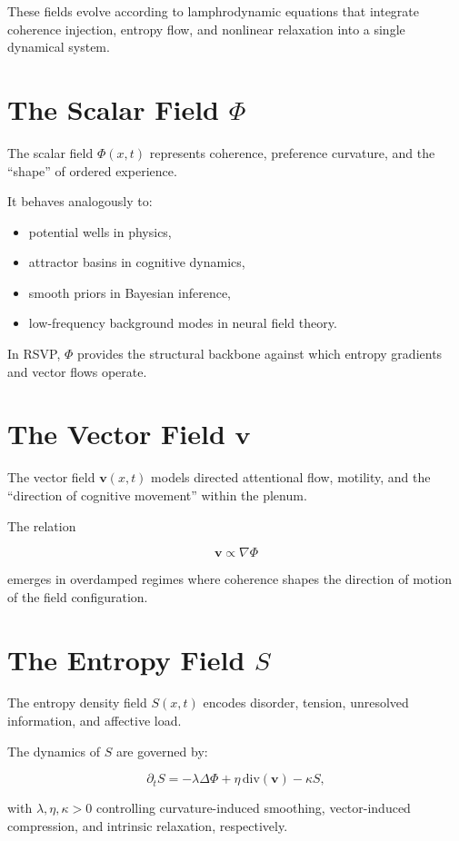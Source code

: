 \documentclass[12pt]{article}
\begin{document}
These fields evolve according to lamphrodynamic equations that integrate
coherence injection, entropy flow, and nonlinear relaxation into a single dynamical system.

\section{The Scalar Field $\Phi$}

The scalar field $\Phi(x,t)$ represents coherence, preference curvature,
and the ``shape'' of ordered experience.

It behaves analogously to:

\begin{itemize}
\item potential wells in physics,
\item attractor basins in cognitive dynamics,
\item smooth priors in Bayesian inference,
\item low-frequency background modes in neural field theory.
\end{itemize}

In RSVP, $\Phi$ provides the structural backbone against which entropy gradients
and vector flows operate.

\section{The Vector Field $\mathbf{v}$}

The vector field $\mathbf{v}(x,t)$ models directed attentional flow, motility,
and the ``direction of cognitive movement'' within the plenum.

The relation

\[
\mathbf{v} \propto \nabla \Phi
\]

emerges in overdamped regimes where coherence shapes the direction of motion of
the field configuration.

\section{The Entropy Field $S$}

The entropy density field $S(x,t)$ encodes disorder, tension, unresolved
information, and affective load.

The dynamics of $S$ are governed by:

\[
\partial_t S
= -\lambda \Delta\Phi
+ \eta\,\mathrm{div}(\mathbf{v})
- \kappa S,
\]

with $\lambda, \eta, \kappa > 0$ controlling curvature-induced smoothing,
vector-induced compression, and intrinsic relaxation, respectively.
\end{document}
